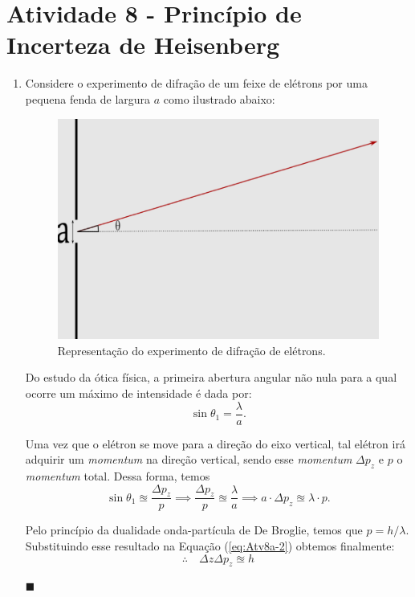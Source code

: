 \documentclass[12pt,a4paper]{article}
\begin{document}
\section*{Atividade 8 - Princípio de Incerteza de Heisenberg}
    \begin{enumerate}[label = \alph*)]
        \item Considere o experimento de difração de um feixe de elétrons por uma pequena fenda de largura $a$ como ilustrado abaixo:
        \begin{figure}[htp!]
            \centering
            \includegraphics[width=0.5\linewidth]{Figures/single-slit.png}
            \caption{Representação do experimento de difração de elétrons.}
            \label{fig:single-slit}
        \end{figure}

        Do estudo da ótica física, a primeira abertura angular não nula para a qual ocorre um máximo de intensidade é dada por:
        \begin{equation}\label{eq:Atv8a-1}
            \sin{\theta_1}=\frac{\lambda}{a}.
        \end{equation}

        Uma vez que o elétron se move para a direção do eixo vertical, tal elétron irá adquirir um \textit{momentum} na direção vertical, sendo esse \textit{momentum} $\Delta p_z$ e $p$ o \textit{momentum} total. Dessa forma, temos
        \begin{equation}\label{eq:Atv8a-2}
            \sin{\theta_1}\approxeq\frac{\Delta p_z}{p}\implies\frac{\Delta p_z}{p}\approxeq\frac{\lambda}{a}\implies a\cdot\Delta p_z\approxeq\lambda\cdot p.
        \end{equation}

        Pelo princípio da dualidade onda-partícula de De Broglie, temos que $p=h/\lambda$. Substituindo esse resultado na Equação (\ref{eq:Atv8a-2}) obtemos finalmente:
        \begin{equation}\label{eq:Atv8a-3}
            \therefore\quad\boxed{\Delta z\Delta p_z\approxeq h}
        \end{equation}
        \begin{flushright}
            $\blacksquare$
        \end{flushright}



\end{enumerate}
\end{document}
